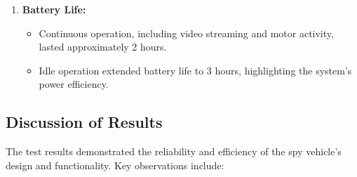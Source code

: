 \documentclass[12pt,a4paper]{report}
\begin{document}
\begin{enumerate}
    \item \textbf{Battery Life:}
    \begin{itemize}
        \item Continuous operation, including video streaming and motor activity, lasted approximately 2 hours.
        \item Idle operation extended battery life to 3 hours, highlighting the system’s power efficiency.
    \end{itemize}
\end{enumerate}



\label{Discussion of Results}
\subsection{Discussion of Results}

The test results demonstrated the reliability and efficiency of the spy vehicle’s design and functionality. Key observations include:
\end{document}
